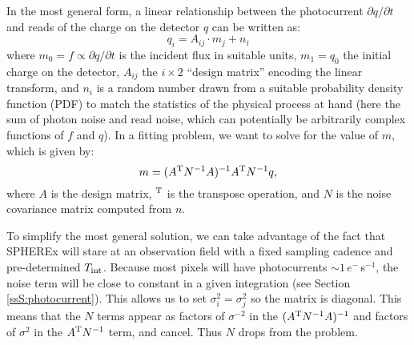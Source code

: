 \documentclass{ws-jai}
\newcommand{\eps}{$e^{-} \,$s$^{-1}$}
\begin{document}
In the most general form, a linear relationship between the
photocurrent $\partial q/\partial t$ and reads of the charge on the
detector $q$ can be written as:
%
\begin{equation}
\label{eq:qi}
q_{i} = A_{ij} \cdot m_{j} + n_{i}
\end{equation}
%
where $m_{0} = f \propto \partial q/\partial t$ is the incident flux in
suitable units, $m_{1} = q_{0}$ the initial charge on the detector,
$A_{ij}$ the $i \times 2$ ``design matrix'' encoding the linear
transform, and $n_{i}$ is a random number drawn from a suitable
probability density function (PDF) to match the statistics of the
physical process at hand (here the sum of photon noise and read noise,
which can potentially be arbitrarily complex functions of $f$ and
$q$).  In a fitting problem, we want to solve for the value of $m$,
which is given by:
%
\begin{equation}
\label{eq:linefit}
  m = (A^{\rm T} N^{-1} A)^{-1} A^{\rm T} N^{-1} q,
\end{equation}
%
where $A$ is the design matrix, $^{\rm T}$ is the transpose operation, and
$N$ is the noise covariance matrix computed from $n$.  

To simplify the most general solution, we can take advantage of the
fact that SPHEREx will stare at an observation field with a fixed
sampling cadence and pre-determined $T_{\rm int}$.  Because most
pixels will have photocurrents $\sim 1 \,$\eps, the noise term will be
close to constant in a given integration (see Section
\ref{ssS:photocurrent}).  This allows us to set
$\sigma_{i}^{2} = \sigma_{j}^{2}$ so the matrix is diagonal.  This
means that the $N$ terms appear as factors of $\sigma^{-2}$ in the
$(A^{\rm T} N^{-1} A)^{-1}$ and factors of $\sigma^{2}$ in the
$A^{\rm T} N^{-1}$ term, and cancel.  Thus $N$ drops from the problem.
\end{document}
